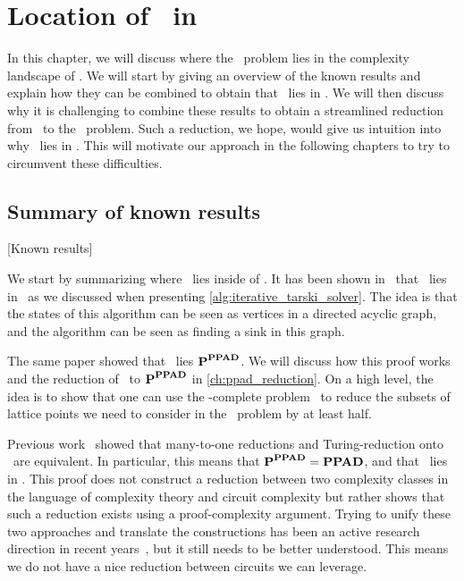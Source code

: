 \setchapterpreamble[u]{\margintoc}
\chapter{Location of \Tarski\ in \TFNP}\label{ch:location_tarski}

In this chapter, we will discuss where the \Tarski\ problem lies in the complexity landscape of \TFNP\@. We will start by giving an overview of the known results and explain how they can be combined to obtain that \Tarski\ lies in \EOPL\@. We will then discuss why it is challenging to combine these results to obtain a streamlined reduction from \Tarski\ to the \EndOfPotentialLine\ problem. Such a reduction, we hope, would give us intuition into why \Tarski\ lies in \EOPL\@. This will motivate our approach in the following chapters to try to circumvent these difficulties.

\section{Summary of known results}[Known results]

We start by summarizing where \Tarski\ lies inside of \TFNP\@. It has been shown in~\cite{etessami_tarskis_2020} that \Tarski\ lies in \PLS\ as we discussed when presenting \cref{alg:iterative_tarski_solver}. The idea is that the states of this algorithm can be seen as vertices in a directed acyclic graph, and the algorithm can be seen as finding a sink in this graph.

The same paper showed that \Tarski\ lies $\textbf{P}^{\textbf{PPAD}}$. We will discuss how this proof works and the reduction of \Tarski\ to $\textbf{P}^{\textbf{PPAD}}$ in \cref{ch:ppad_reduction}. On a high level, the idea is to show that one can use the \PPAD-complete problem \Brouwer\ to reduce the subsets of lattice points we need to consider in the \Tarski\ problem by at least half.

Previous work~ showed that many-to-one reductions and Turing-reduction onto \PPAD\ are equivalent. In particular, this means that $\textbf{P}^{\textbf{PPAD}} = \textbf{PPAD}$, and that \Tarski\ lies in \PPAD{}. This proof does not construct a reduction between two complexity classes in the language of complexity theory and circuit complexity but rather shows that such a reduction exists using a proof-complexity argument. Trying to unify these two approaches and translate the constructions has been an active research direction in recent years~, but it still needs to be better understood. This means we do not have a nice reduction between circuits we can leverage.

